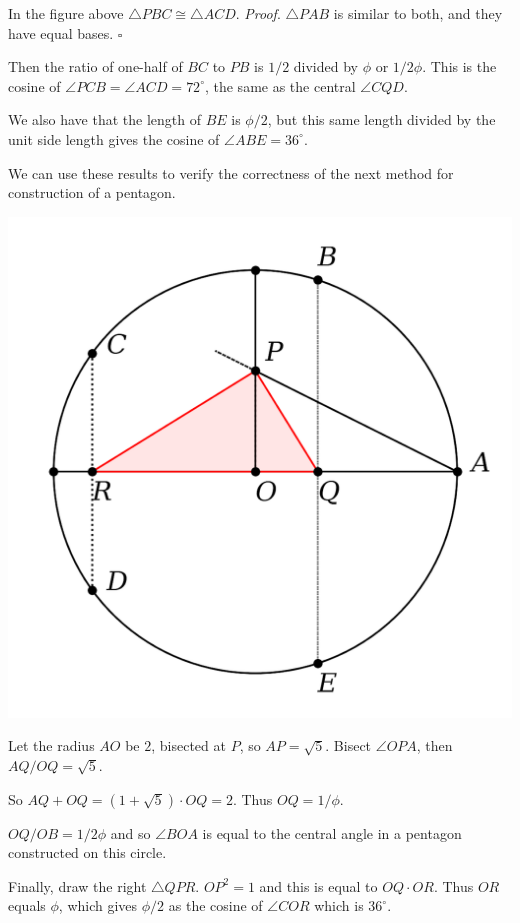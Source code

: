 \documentclass[11pt, oneside]{article}
\begin{document}
In the figure above $\triangle PBC \cong \triangle ACD$.  \emph{Proof}.  $\triangle PAB$ is similar to both, and they have equal bases.  $\square$

Then the ratio of one-half of $BC$ to $PB$ is $1/2$ divided by $\phi$ or $1/2\phi$.  This is the cosine of $\angle PCB = \angle ACD = 72^\circ$, the same as the central $\angle CQD$.

We also have that the length of $BE$ is $\phi/2$, but this same length divided by the unit side length gives the cosine of $\angle ABE = 36^\circ$.

We can use these results to verify the correctness of the next method for construction of a pentagon.
\begin{center} \includegraphics [scale=0.4] {basic_pentagon_crop.png} \end{center}

Let the radius $AO$ be $2$, bisected at $P$, so $AP = \sqrt{5}$.  Bisect $\angle OPA$, then $AQ/OQ = \sqrt{5}$.  

So $AQ + OQ = (1+\sqrt{5}) \cdot OQ = 2$.  Thus $OQ = 1/\phi$.

$OQ/OB = 1/2\phi$ and so $\angle BOA$ is equal to the central angle in a pentagon constructed on this circle.

Finally, draw the right $\triangle QPR$.  $OP^2 = 1$ and this is equal to $OQ \cdot OR$.  Thus $OR$ equals $\phi$, which gives $\phi/2$ as the cosine of $\angle COR$ which is $36^\circ$.
\end{document}
